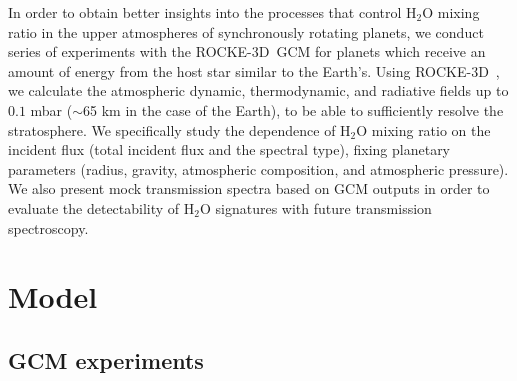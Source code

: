 \documentclass[11pt,numberedappendix,twocolappendix,]{emulateapj}
\def\water{H$_2$O }
\def\modelE{ROCKE-3D}
\def\memo#1{\color{red}$[${\bf #1}$]$ \color{black}}
\begin{document}

In order to obtain better insights into the processes that control \water mixing ratio in the upper atmospheres of synchronously rotating planets, we conduct series of experiments with the \modelE \ GCM for planets which receive an amount of energy from the host star similar to the Earth's. 
Using \modelE \ , we calculate the atmospheric dynamic, thermodynamic, and radiative fields up to $0.1$ mbar ($\sim $65 km in the case of the Earth), to be able to sufficiently resolve the stratosphere. 
We specifically study the dependence of \water mixing ratio on the incident flux (total incident flux and the spectral type), fixing planetary parameters (radius, gravity, atmospheric composition, and atmospheric pressure). 
We also present mock transmission spectra based on GCM outputs in order to evaluate the detectability of \water signatures with future transmission spectroscopy. 




\section{Model}
\label{s:model}

\subsection{GCM experiments}
\end{document}
